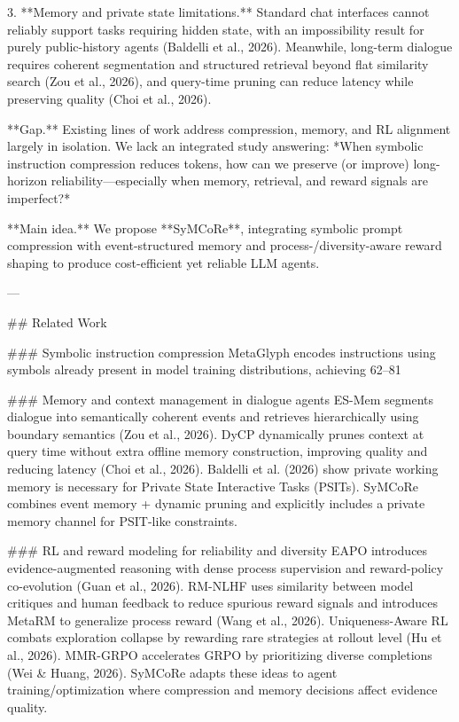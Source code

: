 3. **Memory and private state limitations.** Standard chat interfaces cannot reliably support tasks requiring hidden state, with an impossibility result for purely public-history agents (Baldelli et al., 2026). Meanwhile, long-term dialogue requires coherent segmentation and structured retrieval beyond flat similarity search (Zou et al., 2026), and query-time pruning can reduce latency while preserving quality (Choi et al., 2026).

**Gap.** Existing lines of work address compression, memory, and RL alignment largely in isolation. We lack an integrated study answering: *When symbolic instruction compression reduces tokens, how can we preserve (or improve) long-horizon reliability—especially when memory, retrieval, and reward signals are imperfect?*

**Main idea.** We propose **SyMCoRe**, integrating symbolic prompt compression with event-structured memory and process-/diversity-aware reward shaping to produce cost-efficient yet reliable LLM agents.

---

## Related Work  

### Symbolic instruction compression  
MetaGlyph encodes instructions using symbols already present in model training distributions, achieving 62–81%

### Memory and context management in dialogue agents  
ES-Mem segments dialogue into semantically coherent events and retrieves hierarchically using boundary semantics (Zou et al., 2026). DyCP dynamically prunes context at query time without extra offline memory construction, improving quality and reducing latency (Choi et al., 2026). Baldelli et al. (2026) show private working memory is necessary for Private State Interactive Tasks (PSITs). SyMCoRe combines event memory + dynamic pruning and explicitly includes a private memory channel for PSIT-like constraints.

### RL and reward modeling for reliability and diversity  
EAPO introduces evidence-augmented reasoning with dense process supervision and reward-policy co-evolution (Guan et al., 2026). RM-NLHF uses similarity between model critiques and human feedback to reduce spurious reward signals and introduces MetaRM to generalize process reward (Wang et al., 2026). Uniqueness-Aware RL combats exploration collapse by rewarding rare strategies at rollout level (Hu et al., 2026). MMR-GRPO accelerates GRPO by prioritizing diverse completions (Wei & Huang, 2026). SyMCoRe adapts these ideas to agent training/optimization where compression and memory decisions affect evidence quality.

